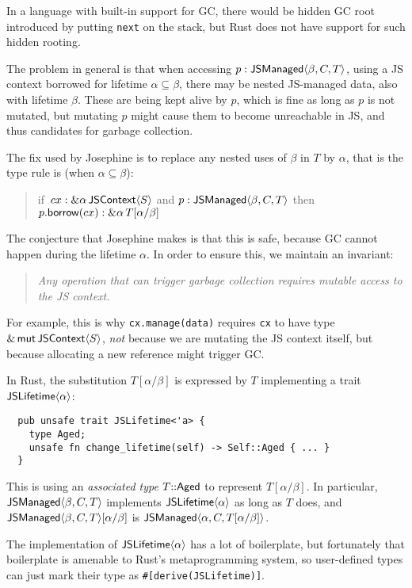 In a language with built-in support for GC, there would be hidden
GC root introduced by putting \verb|next| on the stack, but Rust does
not have support for such hidden rooting.

The problem in general is that when accessing $p:\mathsf{JSManaged}\langle \beta,C,T\rangle$,
using a JS context borrowed
for lifetime $\alpha\subseteq\beta$, there may be nested JS-managed
data, also with lifetime $\beta$. These are being kept alive by $p$,
which is fine as long as $p$ is not mutated, but mutating $p$
might cause them to become unreachable in JS, and thus candidates
for garbage collection.

The fix used by Josephine is to replace any nested uses of
$\beta$ in $T$ by $\alpha$, that is the type rule is
(when $\alpha \subseteq \beta$):
\begin{quote}
  if~$cx: \&\alpha\, \mathsf{JSContext}\langle S\rangle$ and $p: \mathsf{JSManaged}\langle \beta,C,T\rangle$
  then $p.\mathsf{borrow}(cx): \&\alpha\, T[\alpha/\beta]$
\end{quote}
The conjecture that Josephine makes is that this is safe, because
GC cannot happen during the lifetime $\alpha$. In order to ensure
this, we maintain an invariant:
\begin{quote}\em
  Any operation that can trigger garbage collection
  requires mutable access to the JS context.
\end{quote}
For example, this is why \verb|cx.manage(data)| requires
\verb|cx| to have type $\&\,\mathsf{mut}\,\mathsf{JSContext}\langle S\rangle$, \emph{not} because
we are mutating the JS context itself, but because allocating
a new reference might trigger GC.

In Rust, the substitution $T[\alpha/\beta]$ is expressed by
$T$ implementing a trait $\mathsf{JSLifetime}\langle \alpha\rangle$:
\begin{verbatim}
  pub unsafe trait JSLifetime<'a> {
    type Aged;
    unsafe fn change_lifetime(self) -> Self::Aged { ... }
  }
\end{verbatim}
This is using an \emph{associated type} $T{::}\mathsf{Aged}$
to represent $T[\alpha/\beta]$.
In particular, $\mathsf{JSManaged}\langle \beta,C,T\rangle$ implements
$\mathsf{JSLifetime}\langle \alpha\rangle$ as long as $T$ does,
and $\mathsf{JSManaged}\langle \beta,C,T\rangle[\alpha/\beta]$ is $\mathsf{JSManaged}\langle \alpha,C,T[\alpha/\beta]\rangle$.

The implementation of $\mathsf{JSLifetime}\langle \alpha\rangle$ has a lot of boilerplate,
but fortunately that boilerplate is amenable to Rust's metaprogramming
system, so user-defined types can just mark their type as
\verb|#[derive(JSLifetime)]|.

